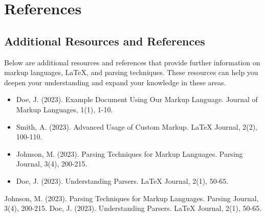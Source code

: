 \documentclass[oneside]{memoir}
\begin{document}
\newpage
\chapter{References}
\section{Additional Resources and References}
Below are additional resources and references that provide further information on markup languages, LaTeX, and parsing techniques. These resources can help you deepen your understanding and expand your knowledge in these areas.\par
\begin{itemize}
\item Doe, J. (2023). Example Document Using Our Markup Language. Journal of Markup Languages, 1(1), 1-10.
\item Smith, A. (2023). Advanced Usage of Custom Markup. LaTeX Journal, 2(2), 100-110.
\item Johnson, M. (2023). Parsing Techniques for Markup Languages. Parsing Journal, 3(4), 200-215.
\item Doe, J. (2023). Understanding Parsers. LaTeX Journal, 2(1), 50-65.
\end{itemize}
\begin{thebibliography}{100}
Johnson, M. (2023). Parsing Techniques for Markup Languages. Parsing Journal, 3(4), 200-215.
Doe, J. (2023). Understanding Parsers. LaTeX Journal, 2(1), 50-65.
\end{thebibliography}
\end{document}
